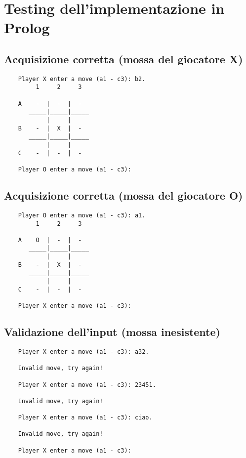 \documentclass{article}
\begin{document}
\section{Testing dell'implementazione in Prolog}

\subsection{Acquisizione corretta (mossa del giocatore X)}
    \begin{verbatim}
    Player X enter a move (a1 - c3): b2.
         1     2     3

    A    -  |  -  |  -  
       _____|_____|_____
            |     |     
    B    -  |  X  |  -  
       _____|_____|_____
            |     |     
    C    -  |  -  |  -  

    Player O enter a move (a1 - c3): 
    \end{verbatim}

\subsection{Acquisizione corretta (mossa del giocatore O)}
    \begin{verbatim}
    Player O enter a move (a1 - c3): a1.
         1     2     3

    A    O  |  -  |  -  
       _____|_____|_____
            |     |     
    B    -  |  X  |  -  
       _____|_____|_____
            |     |     
    C    -  |  -  |  -  

    Player X enter a move (a1 - c3): 
    \end{verbatim}

\subsection{Validazione dell'input (mossa inesistente)}
    \begin{verbatim}
    Player X enter a move (a1 - c3): a32.

    Invalid move, try again!

    Player X enter a move (a1 - c3): 23451.  

    Invalid move, try again!

    Player X enter a move (a1 - c3): ciao.

    Invalid move, try again!

    Player X enter a move (a1 - c3): 
    \end{verbatim}
\end{document}
